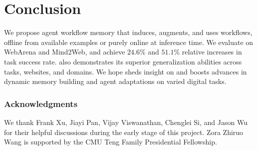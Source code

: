 \section{Conclusion}
\vspace{-1mm}
We propose agent workflow memory that induces, augments, and uses workflows, offline from available examples or purely online at inference time. We evaluate \awm on WebArena and Mind2Web, and achieve $24.6$\% and $51.1$\% relative increases in task success rate. \awm also demonstrates its superior generalization abilities across tasks, websites, and domains. 
We hope \awm sheds insight on and boosts advances in dynamic memory building and agent adaptations on varied digital tasks. 



\subsubsection*{Acknowledgments}
We thank Frank Xu, Jiayi Pan, Vijay Viswanathan, Chenglei Si, and Jason Wu for their helpful discussions during the early stage of this project. Zora Zhiruo Wang is supported by the CMU Teng Family Presidential Fellowship.